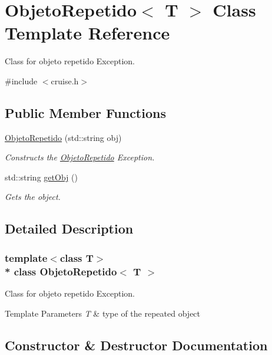 \hypertarget{classObjetoRepetido}{}\section{Objeto\+Repetido$<$ T $>$ Class Template Reference}
\label{classObjetoRepetido}


Class for objeto repetido Exception.  




{\ttfamily \#include $<$cruise.\+h$>$}

\subsection*{Public Member Functions}
\begin{DoxyCompactItemize}
\item 
\hyperlink{classObjetoRepetido_a0b103cdbe7f2ea8e2c4285823644611e}{Objeto\+Repetido} (std\+::string obj)
\begin{DoxyCompactList}\small\item\em Constructs the \hyperlink{classObjetoRepetido}{Objeto\+Repetido} Exception. \end{DoxyCompactList}\item 
std\+::string \hyperlink{classObjetoRepetido_abd0357809b910ea6cbbd33ef907e8dbe}{get\+Obj} ()
\begin{DoxyCompactList}\small\item\em Gets the object. \end{DoxyCompactList}\end{DoxyCompactItemize}


\subsection{Detailed Description}
\subsubsection*{template$<$class T$>$\\*
class Objeto\+Repetido$<$ T $>$}

Class for objeto repetido Exception. 


\begin{DoxyTemplParams}{Template Parameters}
{\em T} & type of the repeated object \\
\hline
\end{DoxyTemplParams}


\subsection{Constructor \& Destructor Documentation}
